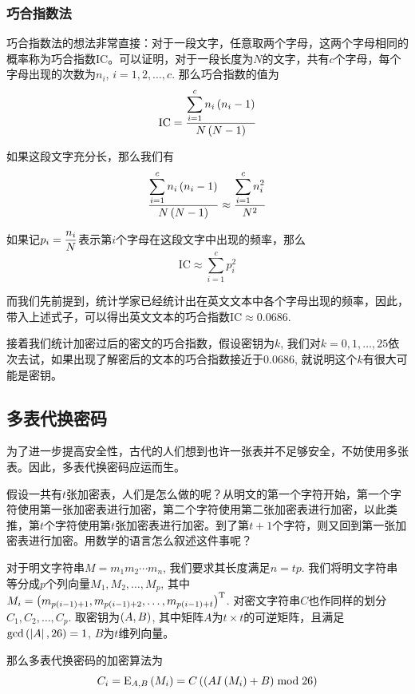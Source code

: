 \subsubsection{巧合指数法}
巧合指数法的想法非常直接：对于一段文字，任意取两个字母，这两个字母相同的概率称为巧合指数$\mathrm{IC}$。可以证明，对于一段长度为$N$的文字，共有$c$个字母，每个字母出现的次数为$n_i$, $i=1, 2, \ldots, c$. 那么巧合指数的值为
\begin{equation}
    \mathrm{IC}=\frac{\displaystyle\sum_{i=1}^cn_i\left( {n_i-1}\right)}{N\left( {N-1}\right)}
\end{equation}

如果这段文字充分长，那么我们有
\begin{equation}
    \frac{\displaystyle\sum_{i=1}^cn_i\left( {n_i-1}\right)}{N\left( {N-1}\right)}\approx\frac{\displaystyle\sum_{i=1}^cn_i^2}{N^2}
\end{equation}

如果记$\displaystyle p_i=\frac{n_i}{N}$表示第$i$个字母在这段文字中出现的频率，那么
\begin{equation}
    \mathrm{IC}\approx\sum_{i=1}^cp_i^2
\end{equation}

而我们先前提到，统计学家已经统计出在英文文本中各个字母出现的频率，因此，带入上述式子，可以得出英文文本的巧合指数$\mathrm{IC}\approx 0.0686$. \par
接着我们统计加密过后的密文的巧合指数，假设密钥为$k$, 我们对$k=0, 1, \ldots, 25$依次去试，如果出现了解密后的文本的巧合指数接近于$0.0686$, 就说明这个$k$有很大可能是密钥。
\subsection{多表代换密码}
为了进一步提高安全性，古代的人们想到也许一张表并不足够安全，不妨使用多张表。因此，多表代换密码应运而生。\par
假设一共有$t$张加密表，人们是怎么做的呢？从明文的第一个字符开始，第一个字符使用第一张加密表进行加密，第二个字符使用第二张加密表进行加密，以此类推，第$t$个字符使用第$t$张加密表进行加密。到了第$t+1$个字符，则又回到第一张加密表进行加密。用数学的语言怎么叙述这件事呢？\par
对于明文字符串$M=m_1m_2\cdots m_n$, 我们要求其长度满足$n=tp$. 我们将明文字符串等分成$p$个列向量$M_1, M_2, \ldots, M_p$, 其中$M_i=\left( {m_{p(i-1)+1}, m_{p(i-1)+2}, \ldots, m_{p(i-1)+t}}\right)^{\mathrm{T}}$. 对密文字符串$C$也作同样的划分$C_1, C_2, \ldots, C_p$. 取密钥为$\left( {A, B}\right)$, 其中矩阵$A$为$t\times t$的可逆矩阵，且满足$\gcd\left( {\left| A \right|, 26}\right)=1$, $B$为$t$维列向量。\par
那么多表代换密码的加密算法为
\begin{equation}
    C_i={\mathrm{E}_{A, B}\left({M_i}\right)}=C\left( {\left( {AI\left( {M_i}\right)+B}\right)\bmod{26}}\right)
\end{equation}

